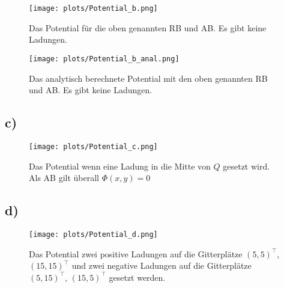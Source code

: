    \begin{figure}[H]
        \centering
        \texttt{[image: plots/Potential\_b.png]} \vspace*{-0.7cm}
        \caption{Das Potential für die oben genannten RB und AB. Es gibt keine Ladungen.}
        \label{fig:Potential_b}
    \end{figure}
    \FloatBarrier
    \vspace*{-1cm}
    \begin{figure}[H]
        \centering
        \texttt{[image: plots/Potential\_b\_anal.png]} \vspace*{-0.7cm}
        \caption{Das analytisch berechnete Potential mit den oben genannten RB und AB. Es gibt keine Ladungen.}
        \label{fig:Potential_b_anal}
    \end{figure}
    \FloatBarrier

\subsection{c)}
    \vspace*{-1.5cm}
    \begin{figure}[H]
        \centering
        \texttt{[image: plots/Potential\_c.png]} \vspace*{-0.7cm}
        \caption{Das Potential wenn eine Ladung in die Mitte von $Q$ gesetzt wird. Als AB gilt überall $\Phi(x,y) = 0$}
        \label{fig:Potential_c}
    \end{figure}
    \FloatBarrier

\subsection{d)}
    \vspace*{-1.5cm}
    \begin{figure}[H]
        \centering
        \texttt{[image: plots/Potential\_d.png]} \vspace*{-0.7cm}
        \caption{Das Potential zwei positive Ladungen auf die Gitterplätze $(5,5)^\top$, $(15,15)^\top$ und zwei negative Ladungen auf die Gitterplätze $(5,15)^\top$, $(15,5)^\top$ gesetzt werden.}
        \label{fig:Potential_d}
    \end{figure}
    \FloatBarrier

